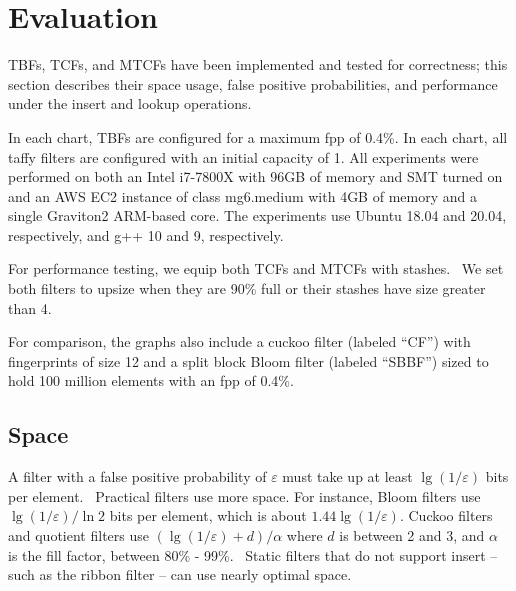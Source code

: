 \documentclass[sigconf]{acmart}
\begin{document}

\section{Evaluation}
\label{eval}


TBFs, TCFs, and MTCFs have been implemented and tested for correctness; this section describes their space usage, false positive probabilities, and performance under the insert and lookup operations.

In each chart, TBFs are configured for a maximum fpp of 0.4\%.
In each chart, all taffy filters are configured with an initial capacity of 1. %
All experiments were performed on both an Intel i7-7800X with 96GB of memory and SMT turned on and an AWS EC2 instance of class mg6.medium with 4GB of memory and a single Graviton2 ARM-based core.
The experiments use Ubuntu 18.04 and 20.04, respectively, and g++ 10 and 9, respectively.

For performance testing, we equip both TCFs and MTCFs with stashes.~\cite{stash}
We set both filters to upsize when they are 90\% full or their stashes have size greater than 4.

For comparison, the graphs also include a cuckoo filter (labeled ``CF'') with fingerprints of size 12 and a split block Bloom filter (labeled ``SBBF'') sized to hold 100 million elements with an fpp of 0.4\%.

\subsection{Space}

A filter with a false positive probability of $\varepsilon$ must take up at least $\lg (1/\varepsilon)$ bits per element.~\cite{lower-bound}
Practical filters use more space.
For instance, Bloom filters use $\lg (1/\varepsilon)/\ln 2$ bits per element, which is about $1.44 \lg (1/\varepsilon)$.
Cuckoo filters and quotient filters use $(\lg (1/\varepsilon) + d) / \alpha$ where $d$ is between 2 and 3, and $\alpha$ is the fill factor, between 80\% - 99\%.~\cite{cuckoo,quotient-filter,vector-quotient}
Static filters that do not support insert -- such as the ribbon filter -- can use nearly optimal space.~\cite{ribbon}
\end{document}
